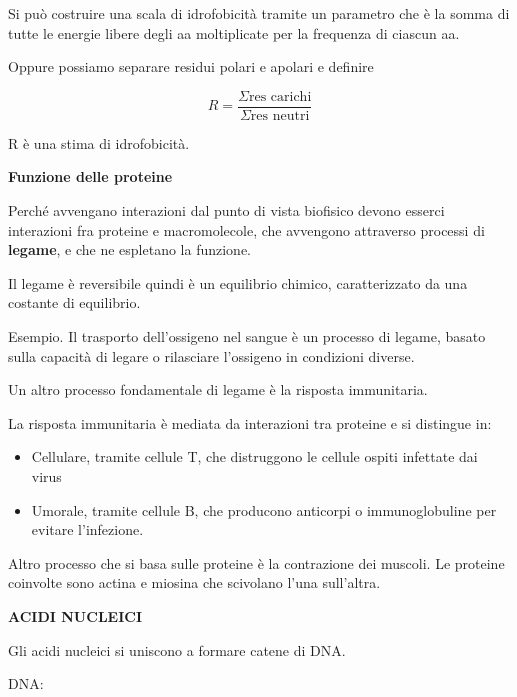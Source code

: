 Si può costruire una scala di idrofobicità tramite un parametro che è la
somma di tutte le energie libere degli aa moltiplicate per la frequenza
di ciascun aa.

Oppure possiamo separare residui polari e apolari e definire

\[R = \frac{\Sigma\text{res\ carichi}}{\Sigma\text{res\ neutri}}\]

R è una stima di idrofobicità.

\textbf{Funzione delle proteine}

Perché avvengano interazioni dal punto di vista biofisico devono esserci
interazioni fra proteine e macromolecole, che avvengono attraverso
processi di \textbf{legame}, e che ne espletano la funzione.

Il legame è reversibile quindi è un equilibrio chimico, caratterizzato
da una costante di equilibrio.

Esempio. Il trasporto dell'ossigeno nel sangue è un processo di legame,
basato sulla capacità di legare o rilasciare l'ossigeno in condizioni
diverse.

Un altro processo fondamentale di legame è la risposta immunitaria.

La risposta immunitaria è mediata da interazioni tra proteine e si
distingue in:

\begin{itemize}
\item
  Cellulare, tramite cellule T, che distruggono le cellule ospiti
  infettate dai virus
\item
  Umorale, tramite cellule B, che producono anticorpi o immunoglobuline
  per evitare l'infezione.
\end{itemize}

Altro processo che si basa sulle proteine è la contrazione dei muscoli.
Le proteine coinvolte sono actina e miosina che scivolano l'una
sull'altra.

\textbf{ACIDI NUCLEICI}

Gli acidi nucleici si uniscono a formare catene di DNA.

DNA:

